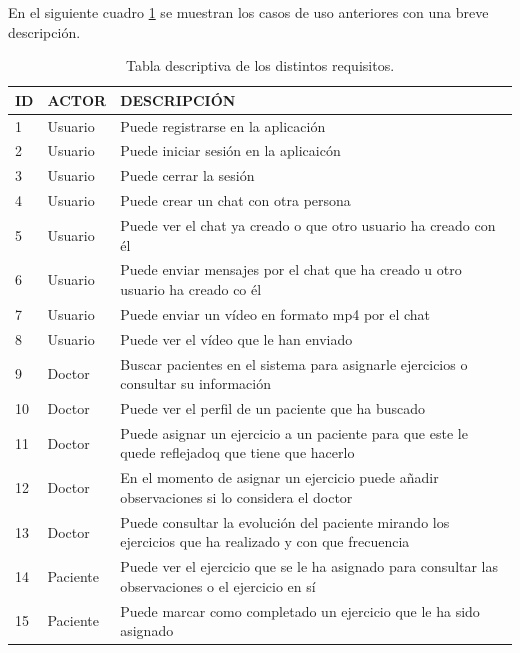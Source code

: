 \medskip
En el siguiente cuadro \ref{tabla-requisitos} se muestran los casos de uso anteriores con una breve descripción.
\begin{table}
    \begin{tabular}{|llp{12cm}|}
        \hline
        ID & ACTOR    & DESCRIPCIÓN \\ \hline
        1  & Usuario  & Puede registrarse en la aplicación \\ \hline
        2  & Usuario  & Puede iniciar sesión en la aplicaicón \\ \hline
        3  & Usuario  & Puede cerrar la sesión \\ \hline
        4  & Usuario  & Puede crear un chat con otra persona \\ \hline
        5  & Usuario  & Puede ver el chat ya creado o que otro usuario ha creado con él \\ \hline
        6  & Usuario  & Puede enviar mensajes por el chat que ha creado u otro usuario
        ha creado co él \\ \hline
        7  & Usuario  & Puede enviar un vídeo en formato mp4 por el chat \\ \hline
        8  & Usuario  & Puede ver el vídeo que le han enviado \\ \hline
        9  & Doctor   & Buscar pacientes en el sistema para asignarle ejercicios o
        consultar su información \\ \hline
        10 & Doctor   & Puede ver el perfil de un paciente que ha buscado \\ \hline
        11 & Doctor   & Puede asignar un ejercicio a un paciente para que este le quede
        reflejadoq que tiene que hacerlo \\ \hline
        12 & Doctor   & En el momento de asignar un ejercicio puede añadir observaciones
        si lo considera el doctor \\ \hline
        13 & Doctor   & Puede consultar la evolución del paciente mirando los ejercicios
        que ha realizado y con que frecuencia \\ \hline
        14 & Paciente & Puede ver el ejercicio que se le ha asignado para consultar las
        observaciones o el ejercicio en sí \\ \hline
        15 & Paciente & Puede marcar como completado un ejercicio que le ha sido asignado \\ \hline
    \end{tabular}

    \caption{Tabla descriptiva de los distintos requisitos.}\label{tabla-requisitos}
\end{table}



